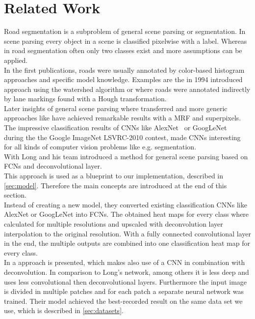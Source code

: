 
\section{Related Work}\label{sec:related-work}
Road segmentation is a subproblem of general scene parsing or segmentation. In
scene parsing every object in a scene is classified pixelwise with a label.
Whereas in road segmentation often only two classes exist and more assumptions
can be applied.\\
In the first publications, roads were usually annotated by color-based
histogram approaches and specific model knowledge. Examples are the in 1994
introduced approach \cite{Beucher1990} using the watershed algorithm or
\cite{aly2008real} where roads were annotated indirectly by lane markings found
with a Hough transformation.\\
Later insights of general scene parsing where transferred and more generic
approaches like \cite{6182716} have achieved remarkable results with a
\gls{MRF} and superpixels.\\ The impressive classification results of
\glspl{CNN} like AlexNet~\cite{krizhevsky2012imagenet} or
GoogLeNet~\cite{SzegedyLJSRAEVR14} during the the Google ImageNet LSVRC-2010
contest, made \glspl{CNN} interesting for all kinds of computer vision problems
like e.g. segmentation.\\
With \cite{long2014fully} Long and his team introduced a method for general
scene parsing based on \glspl{FCN} and deconvolutional layer.\\
This approach is used as a blueprint to our implementation, described in
\cref{sec:model}. Therefore the main concepts are introduced at the end of this
section.\\
Instead of creating a new model, they converted existing classification
\glspl{CNN} like AlexNet or GoogLeNet into \glspl{FCN}. The obtained heat maps for
every class where calculated for multiple resolutions and upscaled with
deconvolution layer interpolation to the original resolution. With a fully
connected convolutional layer in the end, the multiple outputs are combined
into one classification heat map for every class.\\

In \cite{mohan2014deep} a approach is presented, which makes also use of a
\gls{CNN} in combination with deconvolution. In comparison to Long's network,
among others it is less deep and uses less convolutional then deconvolutional
layers. Furthermore the input image is divided in multiple patches and for each
patch a separate neural network was trained. Their model achieved the
best-recorded result on the same data set we use, which is described in
\cref{sec:datasets}.

